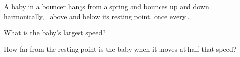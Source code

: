 A baby in a bouncer hangs from a spring and bounces up and down harmonically, \AO\ above and below its resting point, once every \TO.

\begin{abcliste}
\abc
What is the baby's largest speed?

\abc
How far from the resting point is the baby when it moves at half that speed?
\end{abcliste}

